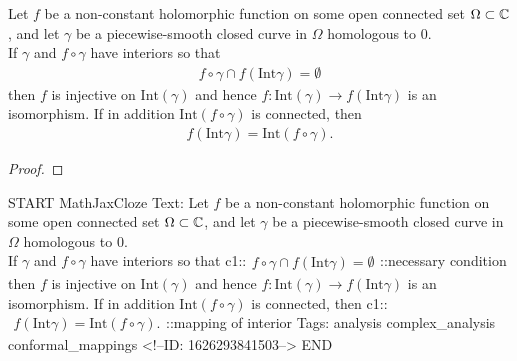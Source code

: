 \documentclass{memoir}
\begin{document}
\begin{thm}
	Let \(f\) be a non-constant holomorphic function on some open connected set \(\Omega \subset \mathbb{C}\), and let \(\gamma \) be a piecewise-smooth closed curve in \(\Omega \) homologous to \(0\).\\

	If \(\gamma \) and \(f\circ \gamma \) have interiors so that
	\begin{align*}
		f\circ \gamma \cap f(\textrm{Int}\gamma ) = \emptyset
	\end{align*}
	then \(f\) is injective on \(\textrm{Int}(\gamma )\) and hence \(f:\textrm{Int}(\gamma )\to f(\textrm{Int}\gamma )\) is an isomorphism. If in addition \(\textrm{Int}(f\circ \gamma )\) is connected, then
	\begin{align*}
		f(\textrm{Int}\gamma ) = \textrm{Int}(f\circ \gamma ).
	\end{align*}
\end{thm}

\begin{proof}
	
\end{proof}

\begin{anki}
START
MathJaxCloze
Text: Let \(f\) be a non-constant holomorphic function on some open connected set \(\Omega \subset \mathbb{C}\), and let \(\gamma \) be a piecewise-smooth closed curve in \(\Omega \) homologous to \(0\).\\

If \(\gamma \) and \(f\circ \gamma \) have interiors so that
{{c1::\(\begin{align*}
        	f\circ \gamma \cap f(\textrm{Int}\gamma ) = \emptyset
        \end{align*}\)::necessary condition}} 
then \(f\) is injective on \(\textrm{Int}(\gamma )\) and hence \(f:\textrm{Int}(\gamma )\to f(\textrm{Int}\gamma )\) is an isomorphism. If in addition \(\textrm{Int}(f\circ \gamma )\) is connected, then
{{c1::\(\begin{align*}
        	f(\textrm{Int}\gamma ) = \textrm{Int}(f\circ \gamma ).
        \end{align*}\)::mapping of interior}}
Tags: analysis complex_analysis conformal_mappings
<!--ID: 1626293841503-->
END
\end{anki}


\begin{exmp}
	
\end{exmp}

\begin{exmp}%
	
\end{exmp}

\end{document}
